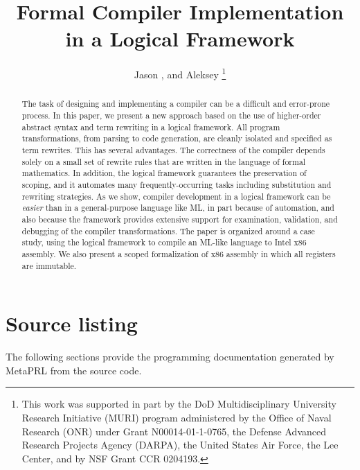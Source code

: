 \documentclass[numreferences]{kluwer}
\begin{document}
\begin{article}
\begin{opening}

\title{Formal Compiler Implementation in a Logical Framework}

\author{Jason , and Aleksey \thanks{This
  work was supported in part by the DoD Multidisciplinary
  University Research Initiative (MURI) program administered by the
  Office of Naval Research (ONR) under Grant N00014-01-1-0765, the
  Defense Advanced Research Projects Agency (DARPA), the United States
  Air Force, the Lee Center, and by NSF Grant CCR 0204193.}}


\begin{abstract}
The task of designing and implementing a compiler can be a
difficult and error-prone process.  In this paper, we present a new
approach based on the use of higher-order abstract syntax and term
rewriting in a logical framework.  All program transformations, from
parsing to code generation, are cleanly isolated and specified as term
rewrites.  This has several advantages.  The correctness of the
compiler depends solely on a small set of rewrite rules that are
written in the language of formal mathematics.  In addition, the logical
framework guarantees the preservation of scoping, and it automates
many frequently-occurring tasks including substitution and rewriting
strategies.  As we show, compiler development in a logical framework
can be \emph{easier} than in a general-purpose language like ML, in
part because of automation, and also because the framework provides
extensive support for examination, validation, and debugging of the
compiler transformations.  The paper is organized around a case study,
using the \MetaPRL{} logical framework to compile an ML-like language to
Intel x86 assembly.  We also present a scoped formalization of x86
assembly in which all registers are immutable.

\end{abstract}
\end{opening}


\newpage
\section{Source listing}

The following sections provide the programming documentation
generated by MetaPRL from the source code.






\end{article}
\end{document}
